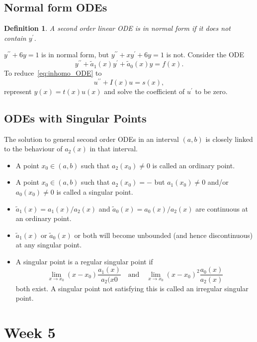 \documentclass{article}
\newtheorem{definition}{Definition}
\begin{document}
\subsection{Normal form ODEs}
\begin{definition}
    A second order linear ODE is in normal form if it does not contain $y^\prime$.
\end{definition}
$y^{\prime\prime}+6y=1$ is in normal form, but $y^{\prime\prime}+xy^\prime +6y=1$ is not.
Consider the ODE
\begin{equation}
    y^{\prime\prime}+\tilde{a}_1(x)y^\prime + \tilde{a}_0(x)y=f(x).\label{eq:inhomo_ODE}
\end{equation}
To reduce~\ref{eq:inhomo_ODE} to
\begin{equation}
    u^{\prime\prime} +I(x)u = s(x),
\end{equation}
represent $y(x) = t(x)u(x)$ and solve the coefficient of $u^\prime$ to be zero.


\subsection{ODEs with Singular Points}
The solution to general second order ODEs in an interval $(a,b)$ is closely linked to the behaviour of $a_2(x)$ in that interval.
\begin{itemize}
    \item A point $x_0\in(a,b)$ such that $a_2(x_0)\neq0$ is called an ordinary point.
    \item A point $x_0\in(a,b)$ such that $a_2(x_0)=-$ but $a_1(x_0)\neq0$ and/or $a_0(x_0)\neq0$ is called a singular point.
    \item $\tilde{a}_1(x) = a_1(x)/a_2(x)$ and $\tilde{a}_0(x) = a_0(x)/a_2(x)$ are continuous at an ordinary point.
    \item $\tilde{a}_1(x)$ or $\tilde{a}_0(x)$ or both will become unbounded (and hence discontinuous) at any singular point.
    \item A singular point is a regular singular point if
    \begin{equation}
        \lim_{x\to x_0}(x-x_0)\frac{a_1(x)}{a_2(x0}\quad\text{and}\quad\lim_{x\to x_0}(x-x_0)^2\frac{a_0(x)}{a_2(x)}
    \end{equation}
    both exist. A singular point not satisfying this is called an irregular singular point.
\end{itemize}


\section{Week 5}
\end{document}
